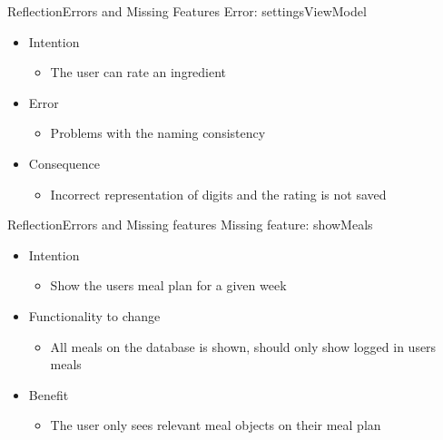 \begin{frame}{Reflection}{Errors and Missing Features}%
	Error: settingsViewModel
	\begin{itemize}
		\item Intention
			\begin{itemize}
			\item The user can rate an ingredient
			\end{itemize}
		\item Error
			\begin{itemize}
			\item Problems with the naming consistency
			\end{itemize}
		\item Consequence
			\begin{itemize}
			\item Incorrect representation of digits and the rating is not saved
			\end{itemize}
	\end{itemize}
\end{frame}
\begin{frame}{Reflection}{Errors and Missing features}	
		Missing feature: showMeals
		\begin{itemize}
			\item Intention
				\begin{itemize}
				\item Show the users meal plan for a given week
				\end{itemize}
			\item Functionality to change
				\begin{itemize}
				\item All meals on the database is shown, should only show logged in users meals
				\end{itemize}
			\item Benefit
				\begin{itemize}
				\item The user only sees relevant meal objects on their meal plan
				\end{itemize}
		\end{itemize}
\end{frame} %

